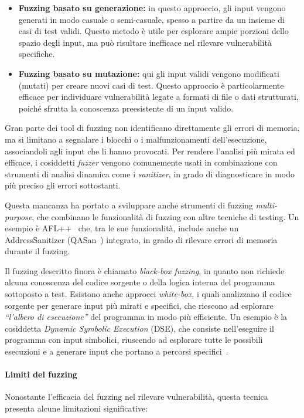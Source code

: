 \begin{itemize}
  \item \textbf{Fuzzing basato su generazione:} in questo approccio, gli input vengono
    generati in modo casuale o semi-casuale, spesso a partire da un insieme di
    casi di test validi. Questo metodo è utile per esplorare ampie porzioni dello
    spazio degli input, ma può risultare inefficace nel rilevare vulnerabilità
    specifiche.

  \item \textbf{Fuzzing basato su mutazione:} qui gli input validi vengono
    modificati (mutati) per creare nuovi casi di test. Questo approccio è particolarmente
    efficace per individuare vulnerabilità legate a formati di file o dati strutturati,
    poiché sfrutta la conoscenza preesistente di un input valido.
\end{itemize}

Gran parte dei tool di fuzzing non identificano direttamente gli errori di
memoria, ma si limitano a segnalare i blocchi o i malfunzionamenti dell'esecuzione,
associandoli agli input che li hanno provocati. Per rendere l'analisi più mirata
ed efficace, i cosiddetti \textit{fuzzer} vengono comunemente usati in combinazione
con strumenti di analisi dinamica come i \textit{sanitizer}, in grado di diagnosticare
in modo più preciso gli errori sottostanti.

Questa mancanza ha portato a sviluppare anche strumenti di fuzzing \textit{multi-purpose},
che combinano le funzionalità di fuzzing con altre tecniche di testing. Un
esempio è AFL++~\cite{afl_plus_plus} che, tra le sue funzionalità, include anche un
AddressSanitizer (QASan~\cite{qasan}) integrato, in grado di rilevare errori di memoria
durante il fuzzing.

Il fuzzing descritto finora è chiamato \textit{black-box fuzzing}, in quanto non
richiede alcuna conoscenza del codice sorgente o della logica interna del programma
sottoposto a test. Esistono anche approcci \textit{white-box}, i quali
analizzano il codice sorgente per generare input più mirati e specifici, che riescono
ad esplorare \textit{``l'albero di esecuzione''} del programma in modo più
efficiente. Un esempio è la cosiddetta \textit{Dynamic Symbolic Execution} (DSE),
che consiste nell'eseguire il programma con input simbolici, riuscendo ad
esplorare tutte le possibili esecuzioni e a generare input che portano a
percorsi specifici~\cite{dynamic_symbolic_execution}.

\paragraph{Limiti del fuzzing}
Nonostante l'efficacia del fuzzing nel rilevare vulnerabilità, questa tecnica presenta
alcune limitazioni significative:

